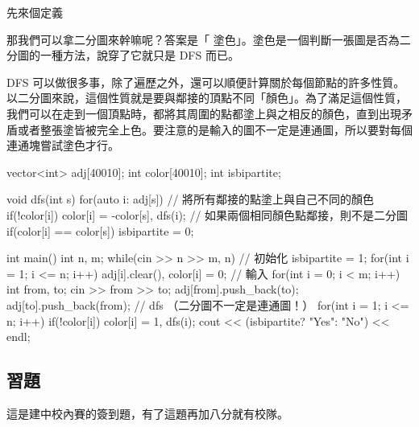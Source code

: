 先來個定義\\


那我們可以拿二分圖來幹嘛呢？答案是「 塗色」。塗色是一個判斷一張圖是否為二分圖的一種方法，說穿了它就只是 DFS 而已。\\


DFS 可以做很多事，除了遍歷之外，還可以順便計算關於每個節點的許多性質。以二分圖來說，這個性質就是要與鄰接的頂點不同「顏色」。為了滿足這個性質，我們可以在走到一個頂點時，都將其周圍的點都塗上與之相反的顏色，直到出現矛盾或者整張塗皆被完全上色。要注意的是輸入的圖不一定是連通圖，所以要對每個連通塊嘗試塗色才行。

\begin{C++}
vector<int> adj[40010];
int color[40010];
int isbipartite;

void dfs(int s){
    for(auto i: adj[s]){
        // 將所有鄰接的點塗上與自己不同的顏色
        if(!color[i]) color[i] = -color[s], dfs(i);
        // 如果兩個相同顏色點鄰接，則不是二分圖
        if(color[i] == color[s]) isbipartite = 0;
    }
}

int main(){
    int n, m;
    while(cin >> n >> m, n){
        // 初始化
        isbipartite = 1;
        for(int i = 1; i <= n; i++){
            adj[i].clear(), color[i] = 0;
        }
        // 輸入
        for(int i = 0; i < m; i++){
            int from, to;
            cin >> from >> to;
            adj[from].push_back(to);
            adj[to].push_back(from);
        }
        // dfs （二分圖不一定是連通圖！）
        for(int i = 1; i <= n; i++){
            if(!color[i]) color[i] = 1, dfs(i);
        }
        cout << (isbipartite? "Yes": "No") << endl;
    }
}
\end{C++}

\subsection{習題}
這是建中校內賽的簽到題，有了這題再加八分就有校隊。\\



